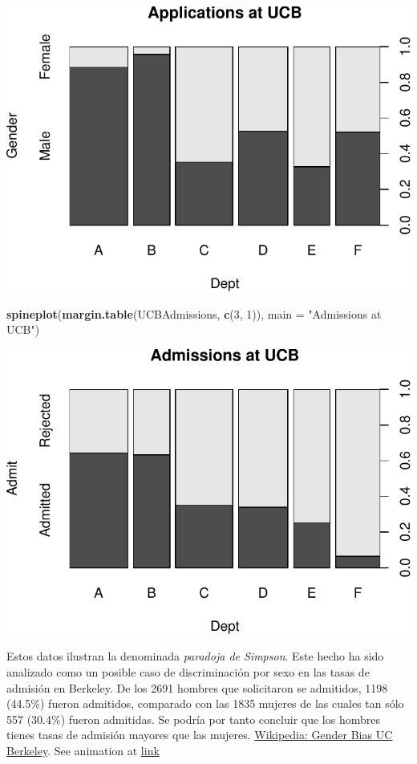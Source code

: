 \documentclass[]{article}
\newenvironment{Shaded}{\begin{snugshade}}{\end{snugshade}}
\newcommand{\KeywordTok}[1]{\textcolor[rgb]{0.13,0.29,0.53}{\textbf{{#1}}}}
\newcommand{\DataTypeTok}[1]{\textcolor[rgb]{0.13,0.29,0.53}{{#1}}}
\newcommand{\DecValTok}[1]{\textcolor[rgb]{0.00,0.00,0.81}{{#1}}}
\newcommand{\StringTok}[1]{\textcolor[rgb]{0.31,0.60,0.02}{{#1}}}
\newcommand{\NormalTok}[1]{{#1}}
\numberwithin{equation}{section}
\begin{document}
\includegraphics{tema1_files/figure-latex/unnamed-chunk-100-1.pdf}

\begin{Shaded}
\begin{Highlighting}[]
\KeywordTok{spineplot}\NormalTok{(}\KeywordTok{margin.table}\NormalTok{(UCBAdmissions, }\KeywordTok{c}\NormalTok{(}\DecValTok{3}\NormalTok{, }\DecValTok{1}\NormalTok{)),}
           \DataTypeTok{main =} \StringTok{"Admissions at UCB"}\NormalTok{)}
\end{Highlighting}
\end{Shaded}

\includegraphics{tema1_files/figure-latex/unnamed-chunk-100-2.pdf}

Estos datos ilustran la denominada \emph{paradoja de Simpson}. Este
hecho ha sido analizado como un posible caso de discriminación por sexo
en las tasas de admisión en Berkeley. De los 2691 hombres que
solicitaron se admitidos, 1198 (44.5\%) fueron admitidos, comparado con
las 1835 mujeres de las cuales tan sólo 557 (30.4\%) fueron admitidas.
Se podría por tanto concluir que los hombres tienes tasas de admisión
mayores que las mujeres.
\href{https://en.wikipedia.org/wiki/Simpson\%27s_paradox\#UC_Berkeley_gender_bias}{Wikipedia:
Gender Bias UC Berkeley}. See animation at
\href{http://vudlab.com/simpsons/}{link}
\end{document}
